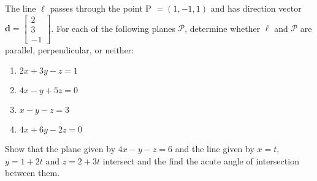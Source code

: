 \documentclass[11pt,letterpaper,boxed]{hmcpset}
\begin{document}


\pagebreak


\begin{problem}[\#18] 
The line $\ell$ passes through the point P $= (1,-1,1)$ and has direction vector $\textbf{d}=\begin{bmatrix} 2 \\ 3 \\ -1 \end{bmatrix}$. For each of the following planes $\mathscr{P}$, determine whether $\ell$ and $\mathscr{P}$ are parallel, perpendicular, or neither:
\begin{enumerate}
\item $2x + 3y - z = 1$
\item $4x - y + 5z = 0$
\item $x - y - z = 3$
\item $4x + 6y - 2z = 0$
\end{enumerate}
\end{problem}



\pagebreak


\begin{problem}[\#46] 
Show that the plane given by $4x-y-z=6$ and the line given by $x=t$, $y=1+2t$ and $z = 2+3t$ intersect and the find the acute angle of intersection between them.
\end{problem}



\pagebreak

\end{document}
